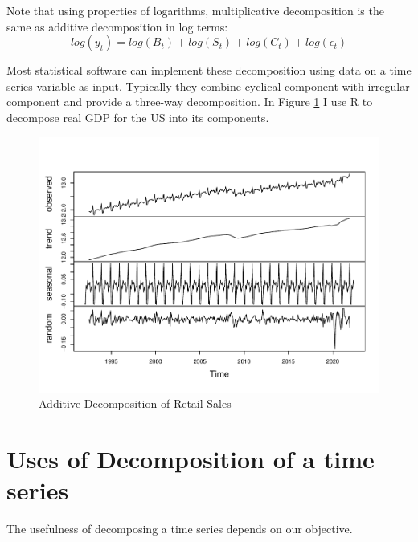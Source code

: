 \documentclass[]{book}
\theoremstyle{definition}
\theoremstyle{definition}
\theoremstyle{definition}
\theoremstyle{remark}
\begin{document}
Note that using properties of logarithms, multiplicative decomposition
is the same as additive decomposition in log terms: \begin{equation}
log(y_t)= log(B_t) + log(S_t) + log(C_t) + log(\epsilon_t)
\end{equation}

Most statistical software can implement these decomposition using data
on a time series variable as input. Typically they combine cyclical
component with irregular component and provide a three-way
decomposition. In Figure \ref{fig:ch3-figure1} I use R to decompose real
GDP for the US into its components.

\begin{figure}

{\centering \includegraphics[width=0.8\linewidth]{bookdown-demo_files/figure-latex/ch3-figure1-1} 

}

\caption{Additive Decomposition of Retail Sales}\label{fig:ch3-figure1}
\end{figure}

\hypertarget{uses-of-decomposition-of-a-time-series}{%
\section{Uses of Decomposition of a time
series}\label{uses-of-decomposition-of-a-time-series}}

The usefulness of decomposing a time series depends on our objective.
\end{document}
